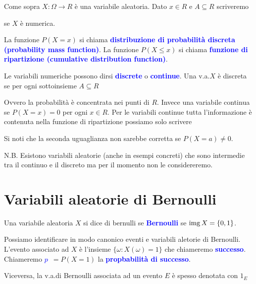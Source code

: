 \documentclass[10pt,openany]{book}
\def\range{\mathop{\rm img}}
\def\emph#1{\textcolor{blue}{\textbf{\boldmath #1}}}
\theoremstyle{mio}
\theoremstyle{liscio}
\begin{document}
Come sopra $X:\Omega\to R$ è una variabile aleatoria. Dato $x\in R$ e $A\subseteq R$ scriveremo

\ceq{\hfill \emph{$p_x$}\medrel{=}\emph{$P(X=x)$}}{=}{P\big(\{\omega\in\Omega\ :\ X(\omega)=x)\}\big)}

\ceq{\hfill \emph{$P(X\in A)$}}{=}{P\big(\{\omega\in\Omega\ :\ X(\omega)\in A)\}\big)}

\ceq{\hfill \emph{$P(X \le x$)}}{=}{P\big(\{\omega\in\Omega\ :\ X(\omega)\le x)\}\big)}\hfill  se $X$ \`e numerica.

La funzione $P(X=x)$ si chiama \emph{distribuzione di probabilità discreta (probability mass function)}. La funzione $P(X \le x)$ si chiama  \emph{funzione di ripartizione (cumulative distribution function)}.

Le variabili numeriche possono dirsi \emph{discrete\/} o \emph{continue}. Una v.a.\@ $X$ è discreta se per ogni sottoinsieme $A\subseteq R$


Ovvero la probabilità è concentrata nei punti di $R$. Invece una variabile continua se $P(X=x)=0$ per ogni $x\in R$. Per le variabili continue tutta l'informazione è contenuta nella funzione di ripartizione possiamo solo scrivere



Si noti che la seconda uguaglianza non sarebbe corretta se $P(X=a)\neq0$.

N.B. Esistono variabili aleatorie (anche in esempi concreti) che sono intermedie tra il continuo e il discreto ma per il momento non le considereremo.



\clearpage\section{Variabili aleatorie di Bernoulli}

Una variabile aleatoria $X$ si dice di bernulli se \emph{Bernoulli\/} se $\range X=\{0,1\}$.

Possiamo identificare in modo canonico eventi e variabili aletorie di Bernoulli. L'evento associato ad $X$ è l'insieme $\{\omega:X(\omega)=1\}$ che chiameremo \emph{successo}. Chiameremo \emph{$p$}\ $ = P(X=1)$ la \emph{propbabilità di successo}.

Viceversa, la v.a.\@ di Bernoulli associata ad un evento $E$ è spesso denotata con $1_E$
\end{document}
